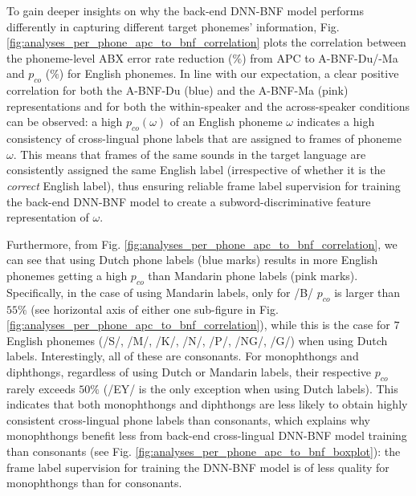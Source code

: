 \documentclass[transmag]{IEEEtran}
\begin{document}
To gain deeper insights on why the back-end DNN-BNF model performs differently in capturing different target phonemes' information,
Fig. \ref{fig:analyses_per_phone_apc_to_bnf_correlation} plots the correlation between the phoneme-level ABX error rate reduction ($\%$) from APC to A-BNF-Du/-Ma and $p_{co}$ ($\%$) for English phonemes. In line with our expectation, a clear positive correlation for both the A-BNF-Du (blue) and the A-BNF-Ma (pink) representations and for both the within-speaker and the across-speaker conditions can be observed: a high $p_{co} (\omega)$ of an English phoneme $\omega$ indicates a high consistency of cross-lingual phone labels that are assigned to frames of phoneme $\omega$. This means that frames of the same sounds in the target language are consistently assigned the same English label (irrespective of whether it is the \textit{correct} English label), thus ensuring reliable frame label supervision for training the back-end DNN-BNF model to create a subword-discriminative feature representation  of $\omega$.

Furthermore, from Fig. \ref{fig:analyses_per_phone_apc_to_bnf_correlation},  we can see that using Dutch phone labels (blue marks) results in more English phonemes getting a high $p_{co}$ than Mandarin phone labels (pink marks). 
Specifically, in the case of using Mandarin labels, only for /B/  $p_{co}$ is larger than $55\%$ (see horizontal axis of either one sub-figure in Fig. \ref{fig:analyses_per_phone_apc_to_bnf_correlation}), while this is the case for $7$ English phonemes (/S/, /M/, /K/, /N/, /P/, /NG/, /G/) when using Dutch labels. 
Interestingly, all of these are consonants. For monophthongs and diphthongs, regardless of using Dutch or Mandarin labels, their respective $p_{co}$ rarely exceeds $50\%$ (/EY/ is the only exception when using Dutch labels).  This indicates that both monophthongs and diphthongs are less likely to obtain highly consistent cross-lingual phone labels than consonants, which explains why monophthongs benefit less from back-end cross-lingual DNN-BNF model training than consonants  (see Fig. \ref{fig:analyses_per_phone_apc_to_bnf_boxplot}): the frame label supervision for training the DNN-BNF model is of less quality for monophthongs than for consonants.
\end{document}
